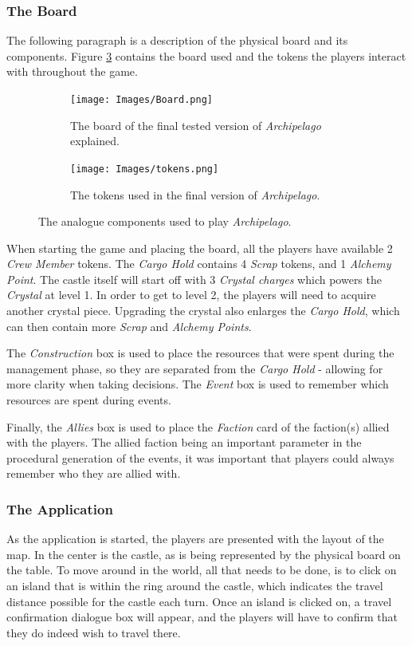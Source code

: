 \subsubsection{The Board}
The following paragraph is a description of the physical board and its components. Figure \ref{fig:compo} contains the board used and the tokens the players interact with throughout the game.
\begin{figure}[!ht]
   \centering
   \begin{subfigure}[b]{\textwidth}
       \texttt{[image: Images/Board.png]}
       \caption{The board of the final tested version of \textit{Archipelago} explained.}
       \label{fig:boardfinal}
   \end{subfigure}
   \begin{subfigure}[b]{\textwidth}
   \centering
       \texttt{[image: Images/tokens.png]}
       \caption{The tokens used in the final version of \textit{Archipelago}.}
       \label{fig:tokens}
   \end{subfigure}
   \caption{The analogue components used to play \textit{Archipelago}.}
   \label{fig:compo}
\end{figure}

When starting the game and placing the board, all the players have available 2 \textit{Crew Member} tokens. The \textit{Cargo Hold} contains 4 \textit{Scrap} tokens, and 1 \textit{Alchemy Point}. The castle itself will start off with 3 \textit{Crystal charges} which powers the \textit{Crystal} at level 1. In order to get to level 2, the players will need to acquire another crystal piece. Upgrading the crystal also enlarges the \textit{Cargo Hold}, which can then contain more \textit{Scrap} and \textit{Alchemy Points}.

The \textit{Construction} box is used to place the resources that were spent during the management phase, so they are separated from the \textit{Cargo Hold} - allowing for more clarity when taking decisions. The \textit{Event} box is used to remember which resources are spent during events. 

Finally, the \textit{Allies} box is used to place the \textit{Faction} card of the faction(s) allied with the players. The allied faction being an important parameter in the procedural generation of the events, it was important that players could always remember who they are allied with. 
\subsubsection{The Application}
As the application is started, the players are presented with the layout of the map. In the center is the castle, as is being represented by the physical board on the table. To move around in the world, all that needs to be done, is to click on an island that is within the ring around the castle, which indicates the travel distance possible for the castle each turn. Once an island is clicked on, a travel confirmation dialogue box will appear, and the players will have to confirm that they do indeed wish to travel there.
